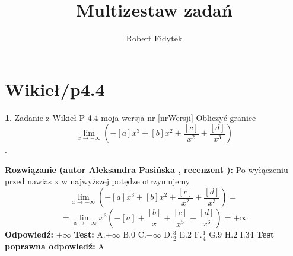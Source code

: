 \documentclass[12pt, a4paper]{article}
\title{Multizestaw zadań}
\author{Robert Fidytek}
\date{}
\theoremstyle{definition} %
\newtheorem{zad}{}
\newcommand{\kategoria}[1]{\section{#1}} %
\newcommand{\zadStart}[1]{\begin{zad}#1\newline} %
\newcommand{\zadStop}{\end{zad}}   %
\newcommand{\rozwStart}[2]{\noindent \textbf{Rozwiązanie (autor #1 , recenzent #2): }\newline} %
\newcommand{\rozwStop}{\newline}                                            %
\newcommand{\odpStart}{\noindent \textbf{Odpowiedź:}\newline}    %
\newcommand{\odpStop}{\newline}                                             %
\newcommand{\testStart}{\noindent \textbf{Test:}\newline} %
\newcommand{\testStop}{\newline} %
\newcommand{\kluczStart}{\noindent \textbf{Test poprawna odpowiedź:}\newline} %
\newcommand{\kluczStop}{\newline} %
\begin{document}
\maketitle


\kategoria{Wikieł/p4.4}
\zadStart{Zadanie z Wikieł P 4.4 moja wersja nr [nrWersji]}
Obliczyć granice$$\lim_{x \rightarrow -\infty}(-[a]x^3+[b]x^2+\frac{[c]}{x^2}+\frac{[d]}{x^3})$$.
\zadStop
\rozwStart{Aleksandra Pasińska}{}
Po wyłączeniu przed nawias x w najwyższej potędze otrzymujemy
$$\lim_{x \rightarrow -\infty}(-[a]x^3+[b]x^2+\frac{[c]}{x^2}+\frac{[d]}{x^3})=$$ $$=\lim_{x\rightarrow -\infty}x^3(-[a]+\frac{[b]}{x}+\frac{[c]}{x^5}+\frac{[d]}{x^6})=+\infty$$
\rozwStop
\odpStart
$+ \infty$
\odpStop
\testStart
A.$+\infty$
B.$0$
C.$-\infty$
D.$\frac{3}{2}$
E.$ 2$
F.$\frac{1}{4}$
G.$9$
H.$2$
I.$34$
\testStop
\kluczStart
A
\kluczStop
\end{document}

